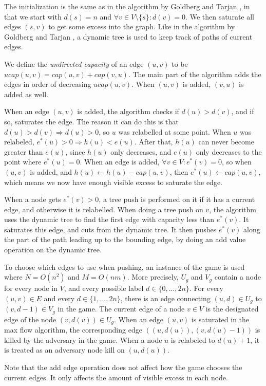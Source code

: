 The initialization is the same as in the algorithm by Goldberg and Tarjan \cite{Goldberg1988}, in that we start with $d(s)=n$ and $\forall v \in V\setminus\{s\}: d(v)=0$. 
We then saturate all edges $(s, v)$ to get some excess into the graph.
Like in the algorithm by Goldberg and Tarjan \cite{Goldberg1988}, a dynamic tree is used to keep track of paths of current edges.

We define the \textit{undirected capacity} of an edge $(u, v)$ to be $ucap(u, v) = cap(u, v) + cap(v, u)$.
The main part of the algorithm adds the edges in order of decreasing $ucap(u, v)$. When $(u, v)$ is added, $(v, u)$ is added as well.

When an edge $(u, v)$ is added, the algorithm checks if $d(u)>d(v)$, and if so, saturates the edge. 
The reason it can do this is that $d(u)>d(v) \Rightarrow d(u)>0$, so $u$ was relabelled at some point.
When $u$ was relabeled, $e^*(u)>0 \Rightarrow h(u)<e(u)$. After that, $h(u)$ can never become greater than $e(u)$, since $h(u)$ only decreases, and $e(u)$ only decreases to the point where $e^*(u) = 0$.
When an edge is added, $\forall v \in V: e^*(v) = 0$, so when $(u, v)$ is added, and $h(u) \gets h(u)-cap(u, v)$, then $e^*(u) \gets cap(u, v)$, which means we now have enough visible excess to saturate the edge.


When a node gets $e^*(v)>0$, a tree push is performed on it if it has a current edge, and otherwise it is relabelled.
When doing a tree push on $v$, the algorithm uses the dynamic tree to find the first edge with capacity less than $e^*(v)$. It saturates this edge, and cuts from the dynamic tree.
It then pushes $e^*(v)$ along the part of the path leading up to the bounding edge, by doing an add value operation on the dynamic tree.

To choose which edges to use when pushing, an instance of the game is used where $N=O(n^2)$ and $M=O(nm)$.
More precisely, $U_g$ and $V_g$ contain a node for every node in $V$, and every possible label $d\in\{0, ..., 2n\}$.
For every $(u, v)\in E$ and every $d\in\{1, ..., 2n\}$, there is an edge connecting $(u, d)\in U_g$ to $(v, d-1)\in V_g$ in the game.
The current edge of a node $v\in V$ is the designated edge of the node $(v, d(v))\in U_g$. 
When an edge $(u, v)$ is saturated in the max flow algorithm, the corresponding edge $((u, d(u)), (v, d(u)-1))$ is killed by the adversary in the game.
When a node $u$ is relabeled to $d(u)+1$, it is treated as an adversary node kill on $(u, d(u))$.

Note that the add edge operation does not affect how the game chooses the current edges. It only affects the amount of visible excess in each node.

